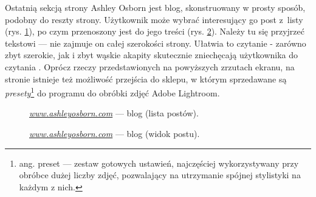 \documentclass[a4paper, 12pt]{article}
\numberwithin{figure}{section}
\begin{document}
\begin{sloppypar}
Ostatnią sekcją strony Ashley Osborn jest blog, skonstruowany w prosty sposób, podobny do reszty strony. Użytkownik może wybrać interesujący go post z~listy (rys. \ref{fig:ashley-4.jpg}), po czym przenoszony jest do jego treści (rys. \ref{fig:ashley-5.jpg}). Należy tu się przyjrzeć tekstowi --- nie zajmuje on całej szerokości strony. Ułatwia to czytanie - zarówno zbyt szerokie, jak i zbyt wąskie akapity skutecznie zniechęcają użytkownika do czytania \cite{szerokosc}. Oprócz rzeczy przedstawionych na powyższych zrzutach ekranu, na stronie istnieje też możliwość przejścia do sklepu, w którym sprzedawane są \textit{presety}\footnote{ang. preset --- zestaw gotowych ustawień, najczęściej wykorzystywany przy obróbce dużej liczby zdjęć, pozwalający na utrzymanie spójnej stylistyki na każdym z nich.} do programu do obróbki zdjęć Adobe Lightroom.

\begin{figure}[H] 
    \centering
   \caption{\textit{\url{www.ashleyosborn.com}} --- blog (lista postów).}
   \label{fig:ashley-4.jpg}
\end{figure}

\begin{figure}[H] 
    \centering
   \caption{\textit{\url{www.ashleyosborn.com}} --- blog (widok postu).}
   \label{fig:ashley-5.jpg}
\end{figure}



\end{sloppypar}
\end{document}

